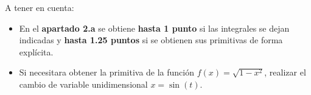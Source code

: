 \documentclass[12pt]{article}
\begin{document}
    \begin{observacion}
        A tener en cuenta:
        \begin{itemize}
            \item En el \textbf{apartado 2.a} se obtiene \textbf{hasta 1 punto} si las integrales se dejan indicadas y \textbf{hasta 1.25 puntos} si se obtienen sus primitivas de forma explícita.
            \item Si necesitara obtener la primitiva de la función $f(x) = \sqrt{1-x^2}$, realizar el cambio de variable unidimensional $x=\sin(t)$.
        \end{itemize}
    \end{observacion}
\end{document}

